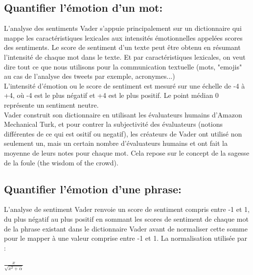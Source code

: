 \subsection{Quantifier l'émotion d'un mot:}
L'analyse des sentiments Vader s'appuie principalement sur un dictionnaire qui mappe les caractéristiques lexicales aux intensités émotionnelles appelées scores des sentiments. Le score de sentiment d'un texte peut être obtenu en résumant l'intensité de chaque mot dans le texte. Et par caractéristiques lexicales, on veut dire tout ce que nous utilisons pour la communication textuelle (mots, "emojis" au cas de l'analyse des tweets par exemple, acronymes...) \\

L'intensité d'émotion ou le score de sentiment est mesuré sur une échelle de -4 à +4, où -4 est le plus négatif et +4 est le plus positif. Le point médian 0 représente un sentiment neutre.\\

Vader construit son dictionnaire en utilisant les évaluateurs humains d'Amazon Mechanical Turk, et pour contrer la subjectivité des évaluateurs (notions différentes de ce qui est ositif ou negatif), les créateurs de Vader ont utilisé non seulement un, mais un certain nombre d'évaluateurs humains et ont fait la moyenne de leurs notes pour chaque mot. Cela repose sur le concept de la sagesse de la foule (the wisdom of the crowd).
\subsection{Quantifier l'émotion d'une phrase:}
L'analyse de sentiment Vader renvoie un score de sentiment compris entre -1 et 1, du plus négatif au plus positif en sommant les scores de sentiment de chaque mot de la phrase existant dans le dictionnaire Vader avant de normaliser cette somme pour le mapper à une valeur comprise entre -1 et 1. La normalisation utilisée par \cite{hutto2014Vader}: \\ 
\begin{center}
    $\frac{x}{\sqrt{x^{2}+\alpha}}$ 
\end{center}

